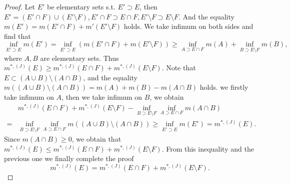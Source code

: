 \documentclass{article}
\begin{document}
\begin{ex}\end{ex}
\begin{proof}
Let $E'$ be elementary sets s.t. $E' \supset E$, then $E' = (E' \cap F) \cup (E' \setminus F), E' \cap F 
\supset E \cap F, E' \setminus F \supset E \setminus F$. And the equality
$m(E') = m(E' \cap F) + m'(E' \setminus F)$ holds. We take infimum on both sides and find that $$
\inf_{E' \supset E} m(E') = \inf_{E' \supset E} (m(E' \cap F) + m(E' \setminus F)) \geq \inf_{A \supset E \cap F} m(A)
+ \inf_{B \supset E \setminus F} m(B),
$$where $A, B$ are elementary sets. Thus $m^{*, (J)}(E) \geq m^{*, (J)}(E \cap F) + m^{*, (J)}(E \setminus F)$.
Note that $E \subset(A \cup B) \setminus (A \cap B)$, and the equality $m((A \cup B) \setminus 
(A \cap B)) = m(A) + m(B) - m(A \cap B)$ holds. we firstly take infimum on $A$, then we take infimum on $B$, we obtain\begin{align*}
&m^{*,(J)}(E \cap F) + m^{*, (J)}(E \setminus F) - \inf_{B \supset E \setminus F} \inf_{A \supset E \cap F} m(A \cap B)\\
={} &\inf_{B \supset E \setminus F} \inf_{A \supset E \cap F} m((A \cup B) \setminus (A \cap B))
\geq \inf_{E' \supset E} m(E') = m^{*, (J)}(E).
\end{align*}
Since $m(A \cap B) \geq 0$, we obtain that $m^{*, (J)}(E) \leq m^{*, (J)}(E \cap F) + m^{*, (J)}(E \setminus F)$. 
From this inequality and the previous one we finally complete the proof$$
m^{*, (J)}(E) = m^{*, (J)}(E \cap F) + m^{*, (J)}(E \setminus F).
$$
\end{proof}
\end{document}

